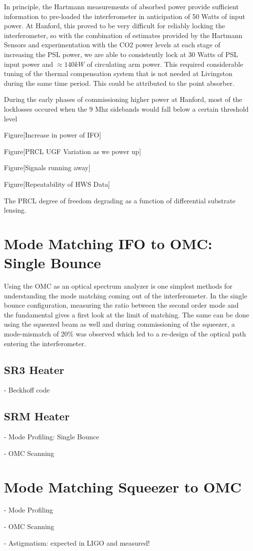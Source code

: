 	In principle, the Hartmann measurements of absorbed power provide sufficient information to pre-loaded the interferometer in anticipation of 50 Watts of input power. At Hanford, this proved to be very difficult for reliably locking the interferometer, so with the combination of estimates provided by the Hartmann Sensors and experimentation with the CO2 power levels at each stage of increasing the PSL power, we are able to consistently lock at 30 Watts of PSL input power and $\approx 140 kW$ of circulating arm power.  This required considerable tuning of the thermal compensation system that is not needed at Livingston during the same time period.  This could be attributed to the point absorber.
	
	During the early phases of commissioning higher power at Hanford, most of the locklosses occured when the 9 Mhz sidebands would fall below a certain threshold level 


		Figure[Increase in power of IFO]
		
		Figure[PRCL UGF Variation as we power up]
		
		Figure[Signals running away]
		
		Figure[Repeatability of HWS Data]
		
		The PRCL degree of freedom degrading as a function of differential substrate lensing.
	

\section{Mode Matching IFO to OMC: Single Bounce}
	Using the OMC as an optical spectrum analyzer is one simplest methods for understanding the mode matching coming out of the interferometer.  In the single bounce configuration, measuring the ratio between the second order mode and the fundamental gives a first look at the limit of matching.  The same can be done using the squeezed beam as well and during commissioning of the squeezer, a mode-mismatch of 20\% was observed which led to a re-design of the optical path entering the interferometer. 
	\subsection{SR3 Heater}
	- Beckhoff code
	
	\subsection{SRM Heater}
	- Mode Profiling: Single Bounce
	
	- OMC Scanning

\section{Mode Matching Squeezer to OMC}
	- Mode Profiling
	
	- OMC Scanning
	
	- Astigmatism: expected in LIGO and measured!